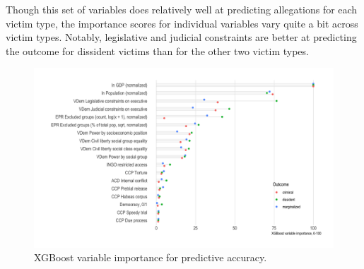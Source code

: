 \documentclass[11pt]{article}
\begin{document}
Though this set of variables does relatively well at predicting allegations for each victim type, the importance scores for individual variables vary quite a bit across victim types. Notably, legislative and judicial constraints are better at predicting the outcome for dissident victims than for the other two victim types. 

\begin{figure}
\begin{center}
\caption{XGBoost variable importance for predictive accuracy.}
\label{var-imp}
\includegraphics[width=.99\textwidth]{../output/figures/xgboost-variable-importance-v1.png}
\end{center}
\end{figure}

\end{document}
